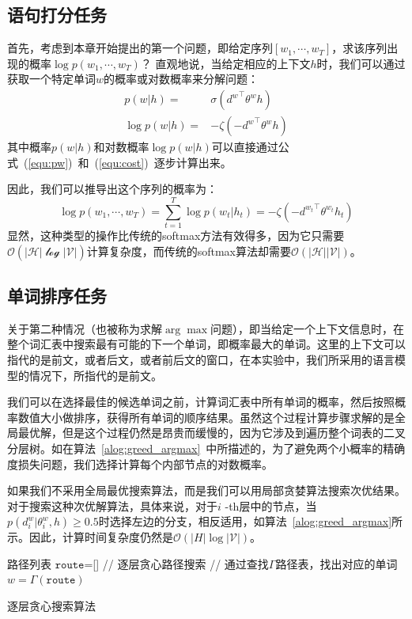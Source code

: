 \subsection{语句打分任务}
首先，考虑到本章开始提出的第一个问题，即给定序列$ [w_1,\cdots,w_T] $，求该序列出现的概率$   \log p(w_1,\cdots, w_T)$？ 直观地说，当给定相应的上下文$ h $时，我们可以通过获取一个特定单词$ w $的概率或对数概率来分解问题：
\begin{equation}
\begin{split}
    p(w|h) =&\sigma({d^w}^\top \theta^w h)\\
   \log p(w|h) =& -\zeta(- {d^{w}}^\top \theta^{w} h )
\end{split}
\end{equation}
其中概率$ p(w|h)$和对数概率$\log p(w | h)$可以直接通过公式~(\ref{equ:pw})~和~(\ref{equ:cost})~逐步计算出来。

因此，我们可以推导出这个序列的概率为：
\begin{equation}
   \log p(w_1,\cdots, w_T)=\sum_{t=1}^T\log p(w_t|h_t) = -\zeta(- {d^{w_t}}^\top \theta^{w_t} h_t )
\end{equation}
显然，这种类型的操作比传统的softmax方法有效得多，因为它只需要$\mathcal{O}(\mathcal {| H | \log| V |})$计算复杂度，而传统的softmax算法却需要$\mathcal{O}(\mathcal {|H||V|})$。

\subsection{单词排序任务}
关于第二种情况（也被称为求解$\arg\max$问题），即当给定一个上下文信息时，在整个词汇表中搜索最有可能的下一个单词，即概率最大的单词。这里的上下文可以指代的是前文，或者后文，或者前后文的窗口，在本实验中，我们所采用的语言模型的情况下，所指代的是前文。

我们可以在选择最佳的候选单词之前，计算词汇表中所有单词的概率，然后按照概率数值大小做排序，获得所有单词的顺序结果。虽然这个过程计算步骤求解的是全局最优解，但是这个过程仍然是昂贵而缓慢的，因为它涉及到遍历整个词表的二叉分层树。如在算法~\ref{alog:greed_argmax}~中所描述的，为了避免两个小概率的精确度损失问题，我们选择计算每个内部节点的对数概率。


如果我们不采用全局最优搜索算法，而是我们可以用局部贪婪算法搜索次优结果。对于搜索这种次优解算法，具体来说，对于$i$ -th层中的节点，当$ p(d^w_i | \theta_{i}^ w,h)\ge 0.5 $时选择左边的分支，相反适用，如算法~\ref{alog:greed_argmax}所示。因此，计算时间复杂度仍然是$ \mathcal{O}(|H|\log\mathcal{|V|})$。


\begin{algorithm}[!ht]
\SetAlgoLined
{}
 路径列表 $\mathtt{route}$=[] \;
 {// 逐层贪心路径搜索}\;
{// 通过查找$\Gamma$路径表，找出对应的单词}\;
$w=\Gamma(\mathtt{route})$\;
\caption{逐层贪心搜索算法\label{alog:greed_argmax}}
\end{algorithm}


